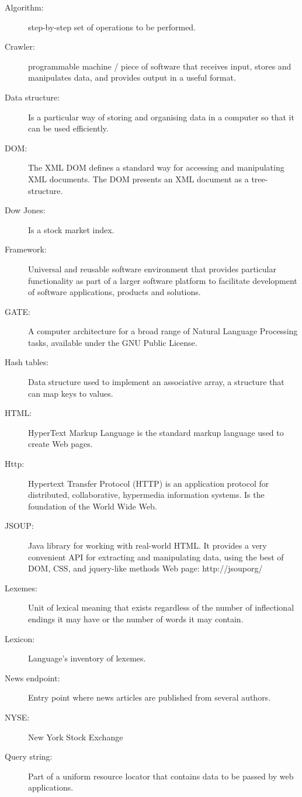 \begin{description}
  \item[Algorithm:] step-by-step set of operations to be performed.
  \item[Crawler:] programmable machine / piece of software that receives input, stores and manipulates data, and provides output in a useful format.
  \item[Data structure:] Is a particular way of storing and organising data in a computer so that it can be used efficiently.
  \item[DOM:] The XML DOM defines a standard way for accessing and manipulating XML documents. The DOM presents an XML document as a tree-structure. 
  \item[Dow Jones:] Is a stock market index.
  \item[Framework:] Universal and reusable software environment that provides particular functionality as part of a larger software platform to facilitate development of software applications, products and solutions.
  \item[GATE:] A computer architecture for a broad range of Natural Language Processing tasks, available under the GNU Public License.
  \item[Hash tables:] Data structure used to implement an associative array, a structure that can map keys to values.
  \item[HTML:] HyperText Markup Language is the standard markup language used to create Web pages.
  \item[Http:] Hypertext Transfer Protocol (HTTP) is an application protocol for distributed, collaborative, hypermedia information systems. Is the foundation of the World Wide Web.
  \item[JSOUP:] Java library for working with real-world HTML. It provides a very convenient API for extracting and manipulating data, using the best of DOM, CSS, and jquery-like methods Web page: http://jsouporg/
  \item[Lexemes:] Unit of lexical meaning that exists regardless of the number of inflectional endings it may have or the number of words it may contain.
  \item[Lexicon:] Language's inventory of lexemes.
  \item[News endpoint:] Entry point where news articles are published from several authors.
  \item[NYSE:] New York Stock Exchange
  \item[Query string:] Part of a uniform resource locator that contains data to be passed by web applications.

\end{description}
